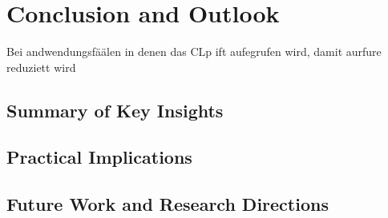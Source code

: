 
\chapter{Conclusion and Outlook}
Bei andwendungsfäälen in denen das CLp ift aufegrufen wird, damit aurfure reduziett wird
\section{Summary of Key Insights}
\section{Practical Implications}
\section{Future Work and Research Directions}

